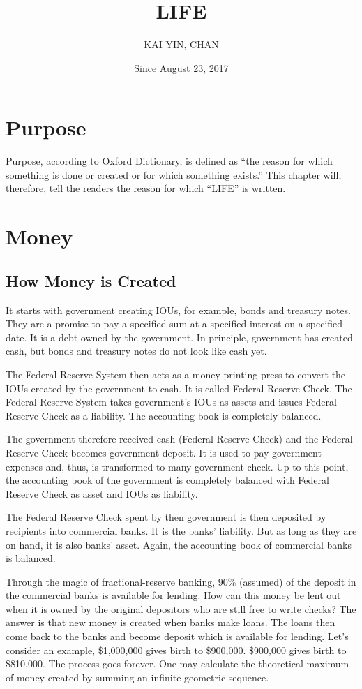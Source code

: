 \documentclass[a4paper]{report}
\begin{document}
\title{LIFE}
\author{KAI YIN, CHAN}
\date{Since August 23, 2017}
\maketitle

\chapter{Purpose}
Purpose, according to Oxford Dictionary, is defined as ``the reason for which something is done or created or for which something exists.'' This chapter will, therefore, tell the readers the reason for which ``LIFE'' is written.

\chapter{Money}
\section{How Money is Created}
It starts with government creating IOUs, for example, bonds and treasury notes. They are a promise to pay a specified sum at a specified interest on a specified date. It is a debt owned by the government. In principle, government has created cash, but bonds and treasury notes do not look like cash yet.

The Federal Reserve System then acts as a money printing press to convert the IOUs created by the government to cash. It is called Federal Reserve Check. The Federal Reserve System takes government's IOUs as assets and issues Federal Reserve Check as a liability. The accounting book is completely balanced.

The government therefore received cash (Federal Reserve Check) and the Federal Reserve Check becomes government deposit. It is used to pay government expenses and, thus, is transformed to many government check. Up to this point, the accounting book of the government is completely balanced with Federal Reserve Check as asset and IOUs as liability.

The Federal Reserve Check spent by then government is then deposited by recipients into commercial banks. It is the banks' liability. But as long as they are on hand, it is also banks' asset. Again, the accounting book of commercial banks is balanced.

Through the magic of fractional-reserve banking, 90\% (assumed) of the deposit in the commercial banks is available for lending. How can this money be lent out when it is owned by the original depositors who are still free to write checks? The answer is that new money is created when banks make loans. The loans then come back to the banks and become deposit which is available for lending. Let's consider an example, \$1,000,000 gives birth to \$900,000. \$900,000 gives birth to \$810,000. The process goes forever. One may calculate the theoretical maximum of money created by summing an infinite geometric sequence.
\end{document}
